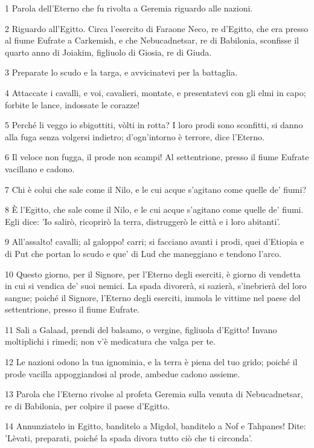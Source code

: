 \par 1 Parola dell'Eterno che fu rivolta a Geremia riguardo alle nazioni.
\par 2 Riguardo all'Egitto. Circa l'esercito di Faraone Neco, re d'Egitto, che era presso al fiume Eufrate a Carkemish, e che Nebucadnetsar, re di Babilonia, sconfisse il quarto anno di Joiakim, figliuolo di Giosia, re di Giuda.
\par 3 Preparate lo scudo e la targa, e avvicinatevi per la battaglia.
\par 4 Attaccate i cavalli, e voi, cavalieri, montate, e presentatevi con gli elmi in capo; forbite le lance, indossate le corazze!
\par 5 Perché li veggo io sbigottiti, vòlti in rotta? I loro prodi sono sconfitti, si danno alla fuga senza volgersi indietro; d'ogn'intorno è terrore, dice l'Eterno.
\par 6 Il veloce non fugga, il prode non scampi! Al settentrione, presso il fiume Eufrate vacillano e cadono.
\par 7 Chi è colui che sale come il Nilo, e le cui acque s'agitano come quelle de' fiumi?
\par 8 È l'Egitto, che sale come il Nilo, e le cui acque s'agitano come quelle de' fiumi. Egli dice: 'Io salirò, ricoprirò la terra, distruggerò le città e i loro abitanti'.
\par 9 All'assalto! cavalli; al galoppo! carri; si facciano avanti i prodi, quei d'Etiopia e di Put che portan lo scudo e que' di Lud che maneggiano e tendono l'arco.
\par 10 Questo giorno, per il Signore, per l'Eterno degli eserciti, è giorno di vendetta in cui si vendica de' suoi nemici. La spada divorerà, si sazierà, s'inebrierà del loro sangue; poiché il Signore, l'Eterno degli eserciti, immola le vittime nel paese del settentrione, presso il fiume Eufrate.
\par 11 Sali a Galaad, prendi del balsamo, o vergine, figliuola d'Egitto! Invano moltiplichi i rimedi; non v'è medicatura che valga per te.
\par 12 Le nazioni odono la tua ignominia, e la terra è piena del tuo grido; poiché il prode vacilla appoggiandosi al prode, ambedue cadono assieme.
\par 13 Parola che l'Eterno rivolse al profeta Geremia sulla venuta di Nebucadnetsar, re di Babilonia, per colpire il paese d'Egitto.
\par 14 Annunziatelo in Egitto, banditelo a Migdol, banditelo a Nof e Tahpanes! Dite: 'Lèvati, preparati, poiché la spada divora tutto ciò che ti circonda'.
